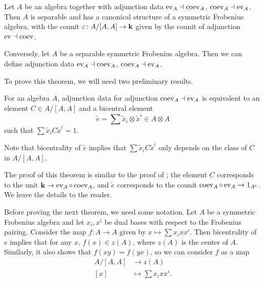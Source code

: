 \begin{theorem}\label{t:adjunction-frob2}
  Let $A$ be an algebra together with adjunction data $\operatorname{ev}_A\dashv\operatorname{coev}_A$,
  $\operatorname{coev}_A\dashv\operatorname{ev}_A$. Then $A$ is separable and has a canonical structure of a
  symmetric Frobenius algebra, with the counit $\varepsilon\colon A/[A,A]\to \mathbf{k}$ given
  by the counit of adjunction $\operatorname{ev}\dashv\operatorname{coev}$.

  Conversely, let $A$ be a separable symmetric Frobenius algebra. Then we can
  define adjunction data $\operatorname{ev}_A\dashv\operatorname{coev}_A$, $\operatorname{coev}_A\dashv\operatorname{ev}_A$.
\end{theorem}

To prove this theorem, we will need two preliminary results.

\begin{theorem}\label{t:adjunction-frob3}
  For an algebra $A$, adjunction data for adjunction $\operatorname{coev}_A\dashv\operatorname{ev}_A$ is
  equivalent to an element $C\in A/[A,A]$ and a bicentral element
  $$
    \tilde e=\sum\tilde x_i\otimes \tilde x^i\in A\otimes A
  $$
  such that $\sum \tilde x_i C \tilde x^i=1$.
\end{theorem}
Note that bicentrality of $\tilde e$ implies that $\sum \tilde x_i C \tilde
x^i$ only depends on the class of $C$ in $A/[A,A]$.

The proof of this theorem is similar to the proof of ;
the element $C$ corresponds to the unit $\mathbf{k} \to \operatorname{ev}_A \circ \operatorname{coev}_A$, and $\tilde
e$ corresponds to the counit $\operatorname{coev}_A\circ \operatorname{ev}_A \to 1_{A^e}$. We leave the
details to the reader.



Before proving the next theorem, we need some notation. Let $A$ be a symmetric
Frobenius algebra and let $x_i, x^i$ be dual bases with respect to the Frobenius
pairing. Consider the map $f\colon A\to A$ given by $x\mapsto \sum x_i xx^i$.
Then bicentrality of $e$ implies that for any $x$, $f(x)\in z(A)$, where $z(A)$
is the center of $A$. Similarly, it also shows that $f(xy)=f(yx)$, so we can
consider $f$ as a map
\begin{equation}\label{e:coinv-inv}
  \begin{aligned}
    A/[A,A]&\to z(A)\\
    [x]&\mapsto \sum x_ixx^i.
  \end{aligned}
\end{equation}



